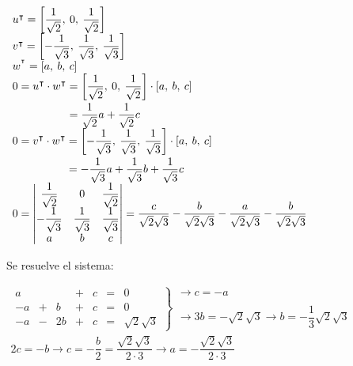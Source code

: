 \begin{enumerate}[label=\color{red}\textbf{\arabic*)}, leftmargin=*]
		$\begin{array}{l}
			u^\intercal=\left[\dfrac{1}{\sqrt{2}},\:0,\:\dfrac{1}{\sqrt{2}}\right]\\
			v^\intercal=\left[-\dfrac{1}{\sqrt{3}},\:\dfrac{1}{\sqrt{3}},\:\dfrac{1}{\sqrt{3}}\right]\\
			w^{^\intercal}=[a,\:b,\:c]\\
			\begin{aligned}
				0=u^\intercal\cdot w^\intercal&=\left[\dfrac{1}{\sqrt{2}},\:0,\:\dfrac{1}{\sqrt{2}}\right]\cdot[a,\:b,\:c]\\
			&=\dfrac{1}{\sqrt{2}}a+\dfrac{1}{\sqrt{2}}c
			\end{aligned}\\
			\begin{aligned}
				0=v^\intercal\cdot w^\intercal&=\left[-\dfrac{1}{\sqrt{3}},\:\dfrac{1}{\sqrt{3}},\:\dfrac{1}{\sqrt{3}}\right]\cdot[a,\:b,\:c]\\
				&=-\dfrac{1}{\sqrt{3}}a+\dfrac{1}{\sqrt{3}}b+\dfrac{1}{\sqrt{3}}c
			\end{aligned}\\
			0=\begin{vmatrix}
			\dfrac{1}{\sqrt{2}} & 0 & \dfrac{1}{\sqrt{2}} \\ 
			-\dfrac{1}{\sqrt{3}} & \dfrac{1}{\sqrt{3}} & \dfrac{1}{\sqrt{3}} \\ 
			a & b & c
			\end{vmatrix} =\dfrac{c}{\sqrt{2}\sqrt{3}}-\dfrac{b}{\sqrt{2}\sqrt{3}}-\dfrac{a}{\sqrt{2}\sqrt{3}}-\dfrac{b}{\sqrt{2}\sqrt{3}}
		\end{array}$
		
		Se resuelve el sistema:
		
		$\begin{array}{l}
			\left.\begin{array}{rcrcrcr}
		a &  &  & + & c & = & 0 \\ 
		-a & + & b & + & c & = & 0 \\ 
		-a & - & 2b & + & c & = & \sqrt{2}\sqrt{3}
		\end{array} \right\rbrace\begin{array}{l}
		\longrightarrow
		 c=-a\\
		\\
		\longrightarrow 3b=-\sqrt{2}\sqrt{3}\longrightarrow b=-\dfrac{1}{3}\sqrt{2}\sqrt{3}
		\end{array}\\
		2c=-b\longrightarrow c=-\dfrac{b}{2}=\dfrac{\sqrt{2}\sqrt{3}}{2\cdot3}\longrightarrow a=-\dfrac{\sqrt{2}\sqrt{3}}{2\cdot3}
		\end{array}$
\end{enumerate}
